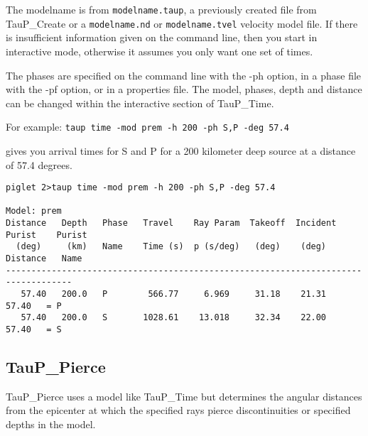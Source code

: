 The modelname is from \texttt{modelname.taup}, a previously created file
from TauP\_Create or a \texttt{modelname.nd} or \texttt{modelname.tvel} velocity model file.
If there is insufficient information given on the command line, then you start
in interactive mode, otherwise it assumes you only want one set of times.

The phases are specified on the command line with the -ph option,
in a phase file with the -pf option, or in a properties file.
The model, phases, depth and distance can be changed within the interactive
section of TauP\_Time.

For example: \texttt{taup time -mod prem -h 200 -ph S,P -deg 57.4}

gives you arrival times for S and P for a 200 kilometer
deep source at a distance of 57.4 degrees.
\begin{verbatim}
piglet 2>taup time -mod prem -h 200 -ph S,P -deg 57.4

Model: prem
Distance   Depth   Phase   Travel    Ray Param  Takeoff  Incident  Purist    Purist
  (deg)     (km)   Name    Time (s)  p (s/deg)   (deg)    (deg)   Distance   Name
-----------------------------------------------------------------------------------
   57.40   200.0   P        566.77     6.969     31.18    21.31    57.40   = P
   57.40   200.0   S       1028.61    13.018     32.34    22.00    57.40   = S
\end{verbatim}

\subsection{TauP\_Pierce}

TauP\_Pierce uses a model like TauP\_Time but
determines the
angular distances from the epicenter at which the specified rays pierce
discontinuities or specified depths in the model.

